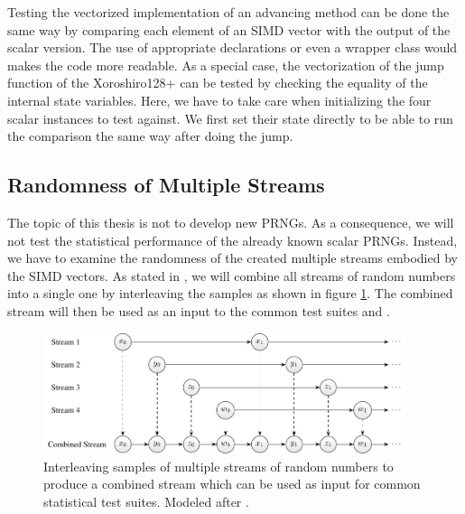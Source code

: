 \documentclass{stdlocal}
\begin{document}
    Testing the vectorized implementation of an advancing method can be done the same way by comparing each element of an SIMD vector with the output of the scalar version.
    The use of appropriate  declarations or even a wrapper class would makes the code more readable.
    As a special case, the vectorization of the jump function of the Xoroshiro128+ can be tested by checking the equality of the internal state variables.
    Here, we have to take care when initializing the four scalar instances to test against.
    We first set their state directly to be able to run the comparison the same way after doing the jump.

  \subsection{Randomness of Multiple Streams} %
  \label{sub:statistical_testing}
    The topic of this thesis is not to develop new PRNGs.
    As a consequence, we will not test the statistical performance of the already known scalar PRNGs.
    Instead, we have to examine the randomness of the created multiple streams embodied by the SIMD vectors.
    As stated in \textcite[\ppno~160-162]{kneusel2018}, we will combine all streams of random numbers into a single one by interleaving the samples as shown in figure \ref{fig:combined-stream}.
    The combined stream will then be used as an input to the common test suites  and  \autocite{testu01,dieharder}.
    \begin{figure}
      \center
      \includegraphics[width=0.95\textwidth]{figures/interleaving_multiple_streams.pdf}
      \caption[Combined Stream by Interleaving Samples of Multiple Streams]{%
        Interleaving samples of multiple streams of random numbers to produce a combined stream which can be used as input for common statistical test suites.
        Modeled after \textcite[\pno~161]{kneusel2018}.
      }
      \label{fig:combined-stream}
    \end{figure}
\end{document}

